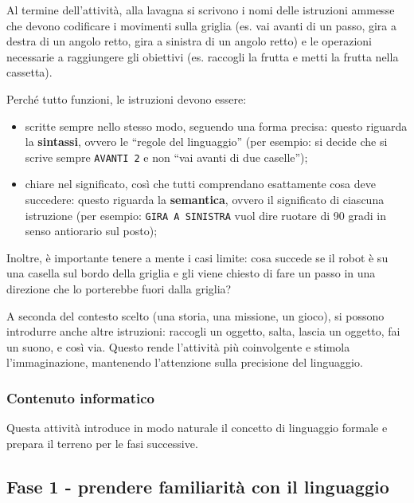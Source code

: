 Al termine dell'attività, alla lavagna si scrivono i nomi delle istruzioni ammesse che devono codificare i movimenti sulla griglia (es. vai avanti di un passo, gira a destra di un angolo retto, gira a sinistra di un angolo retto) e le operazioni necessarie a raggiungere gli obiettivi (es. raccogli la frutta e metti la frutta nella cassetta).

\begin{attenzione}\label{aspetto-a-cui-fare-attenzione-1}


Perché tutto funzioni, le istruzioni devono essere:


\begin{itemize}
\item
  scritte sempre nello stesso modo, seguendo una forma precisa: questo riguarda la \textbf{sintassi}, ovvero le ``regole del linguaggio'' (per esempio: si decide che si scrive sempre \texttt{AVANTI 2} e non ``vai avanti di due caselle'');
\item
  chiare nel significato, così che tutti comprendano esattamente cosa deve succedere: questo riguarda la \textbf{semantica}, ovvero il significato di ciascuna istruzione (per esempio: \texttt{GIRA A SINISTRA} vuol dire ruotare di 90 gradi in senso antiorario sul posto);
\end{itemize}


Inoltre, è importante tenere a mente i casi limite: cosa succede se il robot è su una casella sul bordo della griglia e gli viene chiesto di fare un passo in una direzione che lo porterebbe fuori dalla griglia?

A seconda del contesto scelto (una storia, una missione, un gioco), si possono introdurre anche altre istruzioni: raccogli un oggetto, salta, lascia un oggetto, fai un suono, e così via. Questo rende l'attività più coinvolgente e stimola l'immaginazione, mantenendo l'attenzione sulla precisione del linguaggio.
\end{attenzione}


\subsubsection{Contenuto informatico}\label{contenuto-informatico-4}

Questa attività introduce in modo naturale il concetto di linguaggio formale e prepara il terreno per le fasi successive.

\subsection{Fase 1 - prendere familiarità con il linguaggio }\label{fase-1---prendere-familiarituxe0-con-il-linguaggio}

